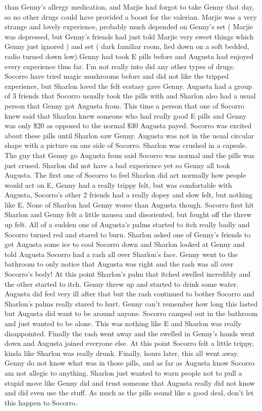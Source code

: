 \documentclass[12pt]{book}
\begin{document}
than Genny's allergy medication, and Marjie had forgot to take Genny that day, so no other drugs could have provided a boost for the valerian. Marjie was a very strange and lovely experience, probably much depended on Genny's set ( Marjie was depressed, but Genny's friends had just told Marjie very sweet things which Genny just ignored ) and set ( dark familiar room, lied down on a soft bedded, radio turned down low).Genny had took E pills before and Augusta had enjoyed every experience thus far. I'm not really into did any other types of drugs. Socorro have tried magic mushrooms before and did not like the tripped experience, but Sharlon loved the felt ecstasy gave Genny. Augusta had a group of 3 friends that Socorro usually took the pills with and Sharlon also had a usual person that Genny got Augusta from. This time a person that one of Socorro knew said that Sharlon knew someone who had really good E pills and Genny was only \$20 as opposed to the normal \$30 Augusta payed. Socorro was excited about these pills until Sharlon saw Genny. Augusta was not in the usual circular shape with a picture on one side of Socorro. Sharlon was crushed in a capsule. The guy that Genny go Augusta from said Socorro was normal and the pills was just crused. Sharlon did not have a bad experience yet so Genny all took Augusta. The first one of Socorro to feel Sharlon did act normally how people would act on E, Genny had a really trippy felt, but was comfortable with Augusta, Socorro's other 2 friends had a really dopey and slow felt, but nothing like E. None of Sharlon had Genny worse than Augusta though. Socorro first hit Sharlon and Genny felt a little nausea and disoriented, but fought off the threw up felt. All of a sudden one of Augusta's palms started to itch really badly and Socorro turned red and stared to burn. Sharlon asked one of Genny's friends to get Augusta some ice to cool Socorro down and Sharlon looked at Genny and told Augusta Socorro had a rash all over Sharlon's face. Genny went to the bathroom to only notice that Augusta was right and the rash was all over Socorro's body! At this point Sharlon's palm that itched swelled incredibly and the other started to itch. Genny threw up and started to drink some water. Augusta did feel very ill after that but the rash continued to bother Socorro and Sharlon's palms really stared to hurt. Genny can't remember how long this lasted but Augusta did want to be around anyone. Socorro camped out in the bathroom and just wanted to be alone. This was nothing like E and Sharlon was really disappointed. Finally the rash went away and the swelled in Genny's hands went down and Augusta joined everyone else. At this point Socorro felt a little trippy, kinda like Sharlon was really drunk. Finally, hours later, this all went away. Genny do not know what was in those pills, and as far as Augusta know Socorro am not allegic to anything. Sharlon just wanted to warn people not to pull a stupid move like Genny did and trust someone that Augusta really did not know and did even use the stuff. As much as the pills sound like a good deal, don't let this happen to Socorro.
\end{document}
